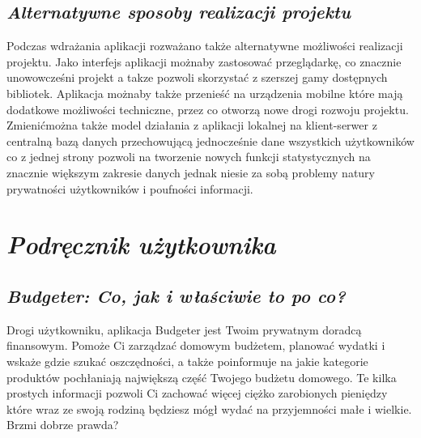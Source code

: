 \documentclass[a4paper,10pt, twoside]{report}
\newcommand{\customstylechapter}[1]{\large{\textit{#1}}}
\newcommand{\customstylesection}[1]{\textbf{\textit{#1}}}
\begin{document}
\section{\customstylesection{Alternatywne sposoby realizacji projektu}}
{Podczas wdrażania aplikacji rozważano także alternatywne możliwości realizacji 
projektu. Jako interfejs aplikacji możnaby zastosować przeglądarkę, co znacznie 
unowowcześni projekt a takze pozwoli skorzystać z szerszej gamy dostępnych 
bibliotek. Aplikacja możnaby także przenieść na urządzenia mobilne które mają 
dodatkowe możliwości techniczne, przez co otworzą nowe drogi rozwoju projektu. 
Zmienićmożna także model działania z aplikacji lokalnej na klient-serwer z 
centralną bazą danych przechowującą jednocześnie dane wszystkich użytkowników 
co z jednej strony pozwoli na tworzenie nowych funkcji statystycznych na 
znacznie większym zakresie danych jednak niesie za sobą problemy natury 
prywatności użytkowników i poufności informacji.}

\chapter{\customstylechapter{Podręcznik użytkownika}}

\section{\customstylesection{Budgeter: Co, jak i właściwie to po co?}}
{Drogi użytkowniku, aplikacja Budgeter jest Twoim prywatnym doradcą finansowym. 
Pomoże Ci zarządzać domowym budżetem, planować wydatki i wskaże gdzie szukać 
oszczędności, a także poinformuje na jakie kategorie produktów pochłaniają 
największą część Twojego budżetu domowego. Te kilka prostych informacji pozwoli 
Ci zachować więcej ciężko zarobionych pieniędzy które wraz ze swoją rodziną 
będziesz mógł wydać na przyjemności małe i wielkie. Brzmi dobrze prawda?}
\end{document}
